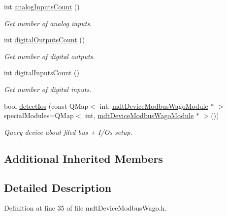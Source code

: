 \begin{DoxyCompactItemize}
int \hyperlink{classmdt_device_modbus_wago_a9da56c13404fd9243c5920ff2ef8bd15}{analog\-Inputs\-Count} ()
\begin{DoxyCompactList}\small\item\em Get number of analog inputs. \end{DoxyCompactList}\item 
int \hyperlink{classmdt_device_modbus_wago_a6711c4e486c3b103b187102685e091cc}{digital\-Outputs\-Count} ()
\begin{DoxyCompactList}\small\item\em Get number of digital outputs. \end{DoxyCompactList}\item 
int \hyperlink{classmdt_device_modbus_wago_ad51fd45858e62c597ba8fc2bf3e877bd}{digital\-Inputs\-Count} ()
\begin{DoxyCompactList}\small\item\em Get number of digital inputs. \end{DoxyCompactList}\item 
bool \hyperlink{classmdt_device_modbus_wago_aae46b00317190b70a59080e9b2917ed6}{detect\-Ios} (const Q\-Map$<$ int, \hyperlink{classmdt_device_modbus_wago_module}{mdt\-Device\-Modbus\-Wago\-Module} $\ast$ $>$ special\-Modules=Q\-Map$<$ int, \hyperlink{classmdt_device_modbus_wago_module}{mdt\-Device\-Modbus\-Wago\-Module} $\ast$ $>$())
\begin{DoxyCompactList}\small\item\em Query device about filed bus + I/\-Os setup. \end{DoxyCompactList}\end{DoxyCompactItemize}
\subsection*{Additional Inherited Members}


\subsection{Detailed Description}


Definition at line 35 of file mdt\-Device\-Modbus\-Wago.\-h.



